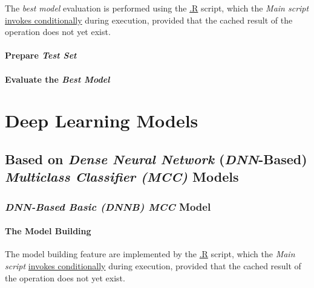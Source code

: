 \documentclass[
]{report}
\begin{document}
The \emph{best model} evaluation is performed using the \href{}{.R} script, which the \emph{Main script} \href{https://github.com/AzKurban-edX-DS/edx.capstone.choose-your-own/blob/main/r/index.R\#L}{invokes conditionally} during execution, provided that the cached result of the operation does not yet exist.

\paragraph{\texorpdfstring{Prepare \emph{Test Set}}{Prepare Test Set}}\label{rf.eval.test_set}

\hfill\break

\paragraph{\texorpdfstring{Evaluate the \emph{Best Model}}{Evaluate the Best Model}}\label{rf.best.eval}

\hfill\break

\newpage

\section{Deep Learning Models}\label{deep-learning-models}

\subsection{\texorpdfstring{Based on \emph{Dense Neural Network} (\emph{DNN}-Based) \emph{Multiclass Classifier (MCC)} Models}{Based on Dense Neural Network (DNN-Based) Multiclass Classifier (MCC) Models}}\label{based-on-dense-neural-network-dnn-based-multiclass-classifier-mcc-models}

\subsubsection{\texorpdfstring{\emph{DNN-Based Basic (DNNB) MCC} Model}{DNN-Based Basic (DNNB) MCC Model}}\label{dnnb_model}

\paragraph{The Model Building}\label{dnnb.build}

\hfill\break

The model building feature are implemented by the \href{}{.R} script, which the \emph{Main script} \href{https://github.com/AzKurban-edX-DS/edx.capstone.choose-your-own/blob/main/r/index.R\#L}{invokes conditionally} during execution, provided that the cached result of the operation does not yet exist.
\end{document}
